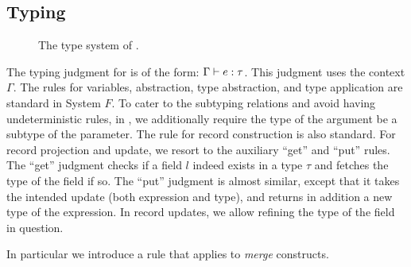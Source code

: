 
\subsection{Typing}

\begin{figure*}

\begin{mathpar}



\end{mathpar}
\begin{mathpar}



\end{mathpar}
\caption{The type system of \name.}
\end{figure*}

The typing judgment for \name is of the form: $ \Gamma \turns e : \tau $. This
judgment uses the context $ \Gamma $. The rules for variables, abstraction, type
abstraction, and type application are standard in System $ F $. To cater to the
subtyping relations and avoid having undeterministic rules, in ,
we additionally require the type of the argument be a subtype of the parameter.
The rule for record construction is also standard. For record projection and
update, we resort to the auxiliary ``get'' and ``put'' rules. The ``get''
judgment checks if a field $ l $ indeed exists in a type $ \tau $ and fetches the
type of the field if so. The ``put'' judgment is almost similar, except that it
takes the intended update (both expression and type), and returns in addition a
new type of the expression. In record updates, we allow refining the type of the
field in question.


In particular we introduce a
 rule that applies to \emph{merge}
constructs.


